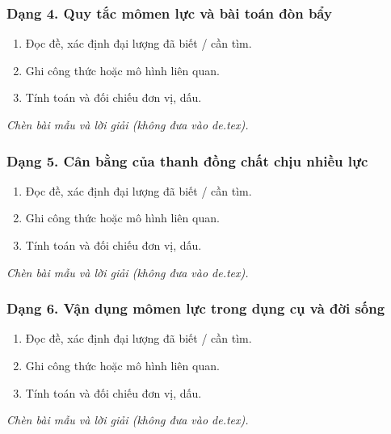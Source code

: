 \subsubsection{Dạng 4. Quy tắc mômen lực và bài toán đòn bẩy}
\begin{phuongphap}
\begin{enumerate}
\item Đọc đề, xác định đại lượng đã biết / cần tìm.
\item Ghi công thức hoặc mô hình liên quan.
\item Tính toán và đối chiếu đơn vị, dấu.
\end{enumerate}
\end{phuongphap}
\begin{vidumau}
\textit{Chèn bài mẫu và lời giải (không đưa vào de.tex).}
\end{vidumau}

\subsubsection{Dạng 5. Cân bằng của thanh đồng chất chịu nhiều lực}
\begin{phuongphap}
\begin{enumerate}
\item Đọc đề, xác định đại lượng đã biết / cần tìm.
\item Ghi công thức hoặc mô hình liên quan.
\item Tính toán và đối chiếu đơn vị, dấu.
\end{enumerate}
\end{phuongphap}
\begin{vidumau}
\textit{Chèn bài mẫu và lời giải (không đưa vào de.tex).}
\end{vidumau}

\subsubsection{Dạng 6. Vận dụng mômen lực trong dụng cụ và đời sống}
\begin{phuongphap}
\begin{enumerate}
\item Đọc đề, xác định đại lượng đã biết / cần tìm.
\item Ghi công thức hoặc mô hình liên quan.
\item Tính toán và đối chiếu đơn vị, dấu.
\end{enumerate}
\end{phuongphap}
\begin{vidumau}
\textit{Chèn bài mẫu và lời giải (không đưa vào de.tex).}
\end{vidumau}

